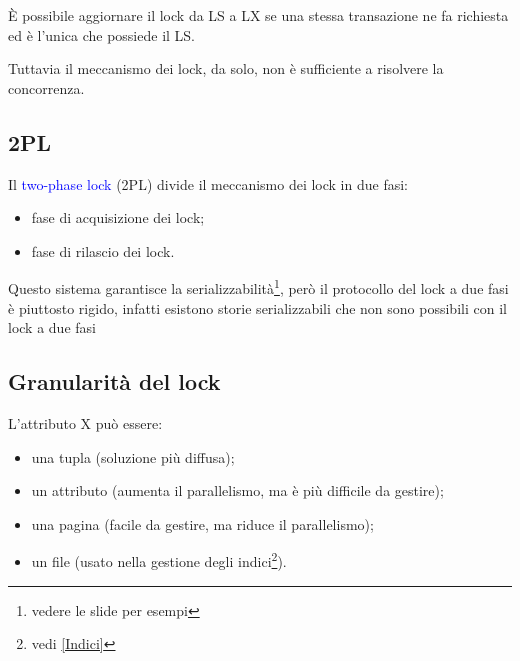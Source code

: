 È possibile aggiornare il lock da LS a LX se una stessa transazione ne fa richiesta ed è l’unica che possiede il LS.

Tuttavia il meccanismo dei lock, da solo, non è sufficiente a risolvere la concorrenza.

\subsection{2PL}

Il \textcolor{blue}{two-phase lock} (2PL) divide il meccanismo dei lock in due fasi:

\begin{itemize}
    \item fase di acquisizione dei lock;
    \item fase di rilascio dei lock.
\end{itemize}

Questo sistema garantisce la serializzabilità\footnote{vedere le slide per esempi}, però il protocollo del lock a due fasi è piuttosto rigido, infatti esistono storie serializzabili che non sono possibili con il lock a due fasi

\subsection{Granularità del lock}

L'attributo X può essere:
\begin{itemize}
    \item una tupla (soluzione più diffusa);
    \item un attributo (aumenta il parallelismo, ma è più difficile da gestire);
    \item una pagina (facile da gestire, ma riduce il parallelismo);
    \item un file (usato nella gestione degli indici\footnote{vedi \ref{Indici}}).
\end{itemize}